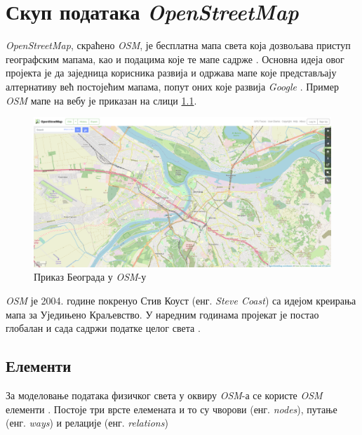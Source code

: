 \documentclass[12pt,oneside]{memoir}
\begin{document}
 %

\chapter{Скуп података \textit{OpenStreetMap}}
\label{chp:osm}

\textit{OpenStreetMap}, скраћено \textit{OSM}, је бесплатна мапа света која дозвољава приступ географским мапама, као и подацима које те мапе садрже \cite{osm_wiki}. Основна идеја овог пројекта је да заједница корисника развија и одржава мапе које представљају алтернативу већ постојећим мапама, попут оних које развија \textit{Google} \cite{google_maps}. Пример \textit{OSM} мапе на вебу је приказан на слици \ref{fig:osm_map_example}.

\begin{figure}[!ht]
  \centering
  \includegraphics[width=1\textwidth]{pictures/osm_example.png}
  \caption{Приказ Београда у \textit{OSM}-у}
  \label{fig:osm_map_example}
\end{figure}

\textit{OSM} је 2004. године покренуо Стив Коуст (енг. \textit{Steve Coast}) са идејом креирања мапа за Уједињено Краљевство. У наредним годинама пројекат је постао глобалан и сада садржи податке целог света \cite{osm_wiki}.

\section{Елементи}
\label{sec:osm_elementi}

За моделовање података физичког света у оквиру \textit{OSM}-а се користе \textit{OSM} елементи \cite{osm_wiki}. Постоје три врсте елемената и то су чворови (енг. \textit{nodes}), путање (енг. \textit{ways}) и релације (енг. \textit{relations})
\end{document}
